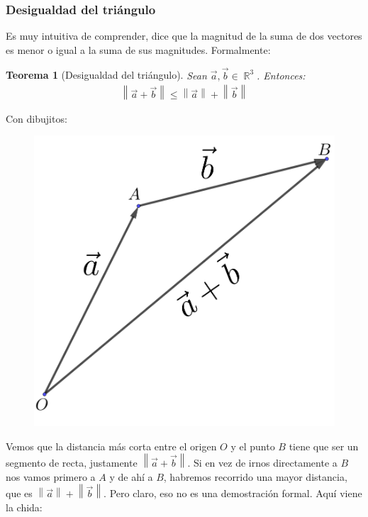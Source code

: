 \documentclass[12pt, fleqn]{report}                             %
\newcommand{\Abs}[1]{\left\lVert #1 \right\lVert}               %
\newtheorem{Theorem}{Teorema}[section]                          %
\DeclareMathOperator \Reals        {\mathbb{R}}                 %
\begin{document}
                \clearpage
                
                \subsubsection{Desigualdad del triángulo}
                
                Es muy intuitiva de comprender, dice que la magnitud de la suma de dos vectores es menor o igual a la suma de sus magnitudes. Formalmente:
                
                \begin{Theorem}[Desigualdad del triángulo]
                	Sean $\vec{a}, \vec{b} \in \Reals^3$. Entonces:
                	\begin{align}
	                	\Abs{\vec{a}+\vec{b}} \leq \Abs{\vec{a}} + \Abs{\vec{b}} \label{triangleInequality}
                	\end{align}
                \end{Theorem}
            
            	Con dibujitos:
            	\begin{figure}[H]
            		\centering
            		\includegraphics[scale=1]{triangleInequality.png}
            	\end{figure}
            
            	Vemos que la distancia más corta entre el origen $O$ y el punto $B$ tiene que ser un segmento de recta, justamente $\Abs{\vec{a}+\vec{b}}$. Si en vez de irnos directamente a $B$ nos vamos primero a $A$ y de ahí a $B$, habremos recorrido una mayor distancia, que es $\Abs{\vec{a}}+\Abs{\vec{b}}$. Pero claro, eso no es una demostración formal. Aquí viene la chida:
            	
\end{document}
